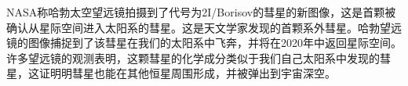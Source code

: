 \begin{multicols}{3}
NASA称哈勃太空望远镜拍摄到了代号为2I/Borisov的彗星的新图像，这是首颗被确认从星际空间进入太阳系的彗星。这是天文学家发现的首颗系外彗星。哈勃望远镜的图像捕捉到了该彗星在我们的太阳系中飞奔，并将在2020年中返回星际空间。许多望远镜的观测表明，这颗彗星的化学成分类似于我们自己太阳系中发现的彗星，这证明明彗星也能在其他恒星周围形成，并被弹出到宇宙深空。\EOA
\end{multicols}

\ADhairui



